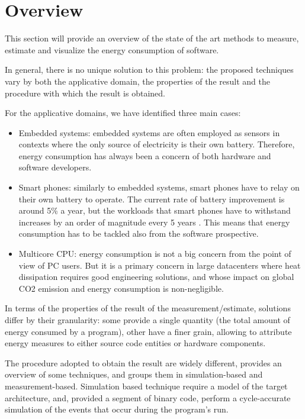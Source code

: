 \section{Overview}

This section will provide an overview of the state of the art methods to measure, estimate and visualize the energy consumption of software. \par
In general, there is no unique solution to this problem: the proposed techniques vary by both the applicative domain, the properties of the result and the procedure with which the result is obtained. \par
For the applicative domains, we have identified three main cases:
\begin{itemize}
\item Embedded systems: embedded systems are often employed as sensors in contexts where the only source of electricity is their own battery. Therefore, energy consumption has always been a concern of both hardware and software developers.
\item Smart phones: similarly to embedded systems, smart phones have to relay on their own battery to operate. The current rate of battery improvement is around 5\% a year, but the workloads that smart phones have to withstand increases by an order of magnitude every 5 years \cite{nunez}. This means that energy consumption has to be tackled also from the software prospective.
\item Multicore CPU: energy consumption is not a big concern from the point of view of PC users. But it is a primary concern in large datacenters where heat dissipation requires good engineering solutions, and whose impact on global CO2 emission and energy consumption is non-negligible.
\end{itemize}
\par In terms of the properties of the result of the measurement/estimate, solutions differ by their granularity: some provide a single quantity (the total amount of energy consumed by a program), other have a finer grain, allowing to attribute energy measures to either source code entities or hardware components. 
\par The procedure adopted to obtain the result are widely different, \cite{rieger} provides an overview of some techniques, and groups them in simulation-based and measurement-based. Simulation based technique require a model of the target architecture, and, provided a segment of binary code, perform a cycle-accurate simulation of the events that occur during the program's run. \newline
